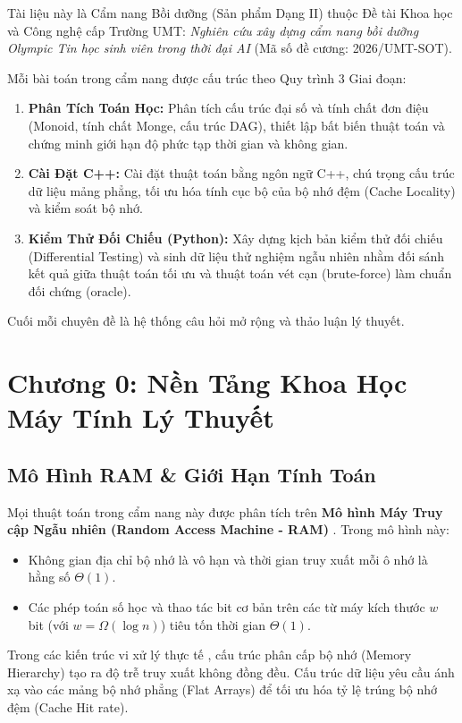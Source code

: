 \documentclass[11pt, letterpaper]{report}
\begin{document}
Tài liệu này là Cẩm nang Bồi dưỡng (Sản phẩm Dạng II) thuộc Đề tài Khoa học và Công nghệ cấp Trường UMT: \textit{Nghiên cứu xây dựng cẩm nang bồi dưỡng Olympic Tin học sinh viên trong thời đại AI} (Mã số đề cương: 2026/UMT-SOT).

Mỗi bài toán trong cẩm nang được cấu trúc theo Quy trình 3 Giai đoạn:

\begin{enumerate}[label=\textbf{Giai đoạn \arabic*:}]
 \item \textbf{Phân Tích Toán Học:} Phân tích cấu trúc đại số và tính chất đơn điệu (Monoid, tính chất Monge, cấu trúc DAG), thiết lập bất biến thuật toán và chứng minh giới hạn độ phức tạp thời gian và không gian.
 \item \textbf{Cài Đặt C++:} Cài đặt thuật toán bằng ngôn ngữ C++, chú trọng cấu trúc dữ liệu mảng phẳng, tối ưu hóa tính cục bộ của bộ nhớ đệm (Cache Locality) và kiểm soát bộ nhớ.
 \item \textbf{Kiểm Thử Đối Chiếu (Python):} Xây dựng kịch bản kiểm thử đối chiếu (Differential Testing) và sinh dữ liệu thử nghiệm ngẫu nhiên nhằm đối sánh kết quả giữa thuật toán tối ưu và thuật toán vét cạn (brute-force) làm chuẩn đối chứng (oracle).
\end{enumerate}

Cuối mỗi chuyên đề là hệ thống câu hỏi mở rộng và thảo luận lý thuyết.

\tableofcontents
\newpage
{}

\chapter*{Chương 0: Nền Tảng Khoa Học Máy Tính Lý Thuyết}
\label{mod:theory_0}

\section{Mô Hình RAM \& Giới Hạn Tính Toán}
Mọi thuật toán trong cẩm nang này được phân tích trên \textbf{Mô hình Máy Truy cập Ngẫu nhiên (Random Access Machine - RAM)} \cite{knuth1997art}. Trong mô hình này:
\begin{itemize}
 \item Không gian địa chỉ bộ nhớ là vô hạn và thời gian truy xuất mỗi ô nhớ là hằng số $\Theta(1)$.
 \item Các phép toán số học và thao tác bit cơ bản trên các từ máy kích thước $w$ bit (với $w = \Omega(\log n)$) tiêu tốn thời gian $\Theta(1)$.
\end{itemize}
Trong các kiến trúc vi xử lý thực tế \cite{stroustrup2013c}, cấu trúc phân cấp bộ nhớ (Memory Hierarchy) tạo ra độ trễ truy xuất không đồng đều. Cấu trúc dữ liệu yêu cầu ánh xạ vào các mảng bộ nhớ phẳng (Flat Arrays) để tối ưu hóa tỷ lệ trúng bộ nhớ đệm (Cache Hit rate).
\end{document}

